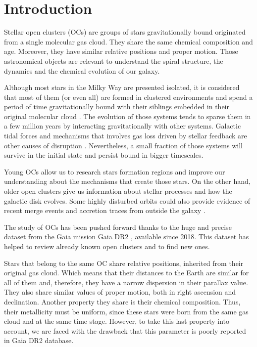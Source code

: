 \documentclass[11pt, a4paper, english]{book}
\begin{document}
\mainmatter
\chapter{Introduction}

Stellar open clusters (OCs) \cite{janes1982open} are groups of stars gravitationally bound originated from a single molecular gas cloud.
They share the same chemical composition and age. Moreover, they have similar relative positions and proper motion.
Those astronomical objects are relevant to understand the spiral structure, the dynamics and the chemical evolution of our galaxy.

Although most stars in the Milky Way are presented isolated, it is considered that most of them (or even all)
are formed in clustered environments and spend a period of time gravitationally bound with their siblings embedded
in their original molecular cloud \cite{clarke2000theformationofstellarclusters} \cite{portegies2010young}.
The evolution of those systems tends to sparse them in a few million years by interacting gravitationally with other systems.
Galactic tidal forces and mechanisms that involves gas loss driven by stellar feedback are other causes of disruption
\cite{brinkmann2017bound}.
Nevertheless, a small fraction of those systems will survive in the initial state and persist bound in bigger timescales.

Young OCs allow us to research stars formation regions and improve our understanding about the mechanisms that create those stars.
On the other hand, older open clusters give us information about stellar processes and how the galactic disk evolves.
Some highly disturbed orbits could also provide evidence of recent merge events and accretion traces from outside the galaxy
\cite{cantat2016abundances}.

The study of OCs has been pushed forward thanks to the huge and precise dataset from the Gaia mission
\cite{collaboration2016description} Gaia DR2 \cite{gaia2018gaia}, available since 2018.
This dataset has helped to review already known open clusters and to find new ones.

Stars that belong to the same OC share relative positions, inherited from their original gas cloud.
Which means that their distances to the Earth are similar for all of them and, therefore, they have a narrow dispersion in their parallax value.
They also share similar values of proper motion, both in right ascension and declination.
Another property they share is their chemical composition.
Thus, their metallicity must be uniform, since these stars were born from the same gas cloud and at the same time stage.
However, to take this last property into account, we are faced with the drawback that this parameter is poorly reported in Gaia DR2 database.
\end{document}
